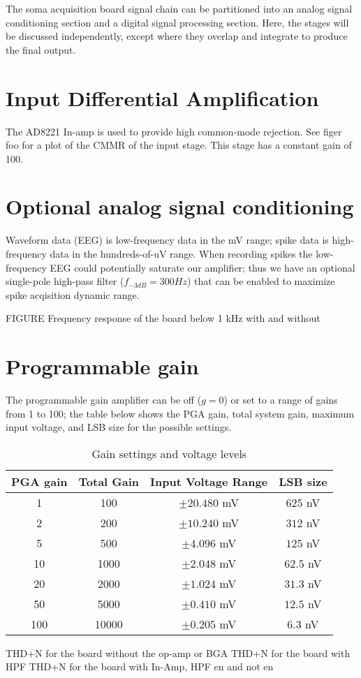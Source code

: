 The soma acquisition board signal chain can be partitioned into an analog signal conditioning section and a digital signal processing section. Here, the stages will be discussed independently, except where they overlap and integrate to produce the final output.

\section{Input Differential Amplification}

The AD8221 In-amp is used to provide high common-mode rejection. See figer foo for a plot of the CMMR of the input stage. This stage has a constant gain of 100. 


\section{Optional analog signal conditioning}
Waveform data (EEG) is low-frequency data in the mV range; spike data is high-frequency data in the hundreds-of-uV range. When recording spikes the low-frequency EEG could potentially saturate our amplifier; thus we have an optional single-pole high-pass filter ($f_{-3dB}=300 Hz$) that can be enabled to maximize spike acqisition dynamic range. 

FIGURE Frequency response of the board below 1 kHz with and without 

\section{Programmable gain}
The programmable gain amplifier can be off ($g=0$) or set to a range of gains from 1 to 100; the table below shows the PGA gain, total system gain, maximum input voltage, and LSB size for the possible settings. 

\begin{table}
\begin{centering}
\begin{tabular}[h!]{|c|c|c|c|}
\hline
PGA gain & Total Gain & Input Voltage Range & LSB size \\
\hline
1 & 100 & $\pm20.480$ mV & $625$ nV \\
2 & 200 & $\pm10.240$ mV & $312$ nV \\
5 & 500 & $\pm4.096$ mV & $125$ nV \\
10 & 1000 & $\pm2.048$ mV & $62.5$ nV \\
20 & 2000 & $\pm1.024$ mV & $31.3$ nV \\
50 & 5000 & $\pm0.410$ mV & $12.5$ nV \\
100 & 10000 & $\pm0.205$ mV & $6.3$ nV \\
\hline
\end{tabular}
\end{centering}
\caption{Gain settings and voltage levels}
\end{table}

THD+N for the board without the op-amp or BGA
THD+N for the board with HPF
THD+N for the board with In-Amp, HPF en and not en

